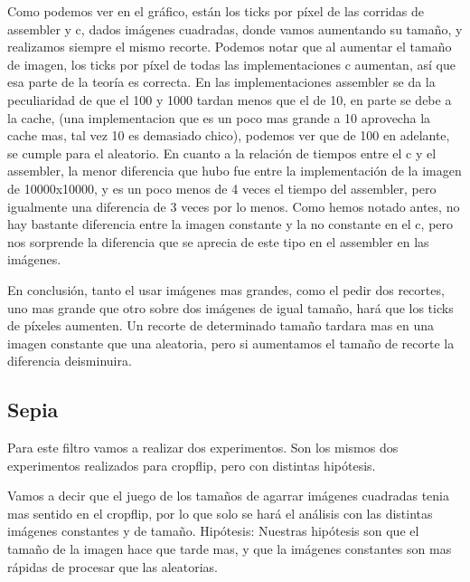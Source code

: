 \hfill \break
Como podemos ver en el gráfico, están los ticks por píxel de las corridas de assembler y c, dados imágenes cuadradas, donde vamos aumentando su tamaño, y realizamos siempre el mismo recorte. 
Podemos notar que al aumentar el tamaño de imagen, los ticks por píxel de todas las implementaciones c aumentan, así que esa parte de la teoría es correcta. En las implementaciones assembler se da la peculiaridad de que el 100 y 1000 tardan menos que el de 10, en parte se debe a la cache, (una implementacion que es un poco mas grande a 10 aprovecha la cache mas, tal vez 10 es demasiado chico), podemos ver que de 100 en adelante, se cumple para el aleatorio.  
        En cuanto a la relación de tiempos entre el c y el assembler, la menor diferencia que hubo fue entre la implementación de la imagen de 10000x10000, y es un poco menos de 4 veces el tiempo del assembler, pero igualmente una diferencia de 3 veces por lo menos. Como hemos notado antes, no hay bastante diferencia  entre la imagen constante y la no constante en el c, pero nos sorprende la diferencia que se aprecia de este tipo en el assembler en las imágenes.   
         
 \hfill \break
En conclusión, tanto el usar imágenes mas grandes, como el pedir dos recortes, uno mas grande que otro sobre dos imágenes de igual tamaño, hará que los ticks de píxeles aumenten. Un recorte de determinado tamaño tardara mas en una imagen constante que una aleatoria, pero si aumentamos el tamaño de  recorte la diferencia deisminuira. 
\hfill \break
\subsection{Sepia}
Para este filtro vamos a realizar dos experimentos. Son los mismos dos experimentos realizados para cropflip, pero con distintas hipótesis.
\hfill \break
 
   Vamos a decir que el juego de los tamaños de agarrar imágenes cuadradas tenia mas sentido en el cropflip, por lo que solo se hará el análisis con las distintas imágenes constantes y de tamaño. 
   \hfill \break
   Hipótesis:  Nuestras hipótesis son que el tamaño de la imagen hace que tarde mas, y que la imágenes constantes son mas rápidas de procesar que las aleatorias.
   
